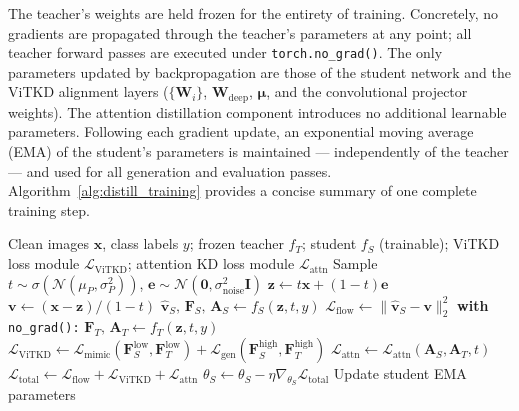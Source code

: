 The teacher's weights are held frozen for the entirety of training. Concretely, no gradients are propagated through the teacher's parameters at any point; all teacher forward passes are executed under \texttt{torch.no\_grad()}. The only parameters updated by backpropagation are those of the student network and the ViTKD alignment layers ($\{\mathbf{W}_i\}$, $\mathbf{W}_{\text{deep}}$, $\boldsymbol{\mu}$, and the convolutional projector weights). The attention distillation component introduces no additional learnable parameters. Following each gradient update, an exponential moving average (EMA) of the student's parameters is maintained — independently of the teacher — and used for all generation and evaluation passes. Algorithm~\ref{alg:distill_training} provides a concise summary of one complete training step.

\begin{algorithm}[ht]
\caption{One Training Step of the Distillation Framework}
\label{alg:distill_training}
\begin{algorithmic}[1]
    \Require Clean images $\mathbf{x}$, class labels $y$; frozen teacher $f_T$; student $f_S$ (trainable); ViTKD loss module $\mathcal{L}_{\text{ViTKD}}$; attention KD loss module $\mathcal{L}_{\text{attn}}$
    \State Sample $t \sim \sigma({\mathcal{N}(\mu_P, \sigma_P^2)})$, $\mathbf{e} \sim \mathcal{N}(\mathbf{0}, \sigma_{\text{noise}}^2\mathbf{I})$
    \State $\mathbf{z} \leftarrow t\mathbf{x} + (1-t)\mathbf{e}$ 
    \State $\mathbf{v} \leftarrow (\mathbf{x} - \mathbf{z}) / (1-t)$ 
    \State $\hat{\mathbf{v}}_S,\, \mathbf{F}_S,\, \mathbf{A}_S \leftarrow f_S(\mathbf{z}, t, y)$ 
    \State $\mathcal{L}_{\text{flow}} \leftarrow \|\hat{\mathbf{v}}_S - \mathbf{v}\|_2^2$
    \State \textbf{with} \texttt{no\_grad():}
    \State \quad $\mathbf{F}_T,\, \mathbf{A}_T \leftarrow f_T(\mathbf{z}, t, y)$ 
    \State $\mathcal{L}_{\text{ViTKD}} \leftarrow \mathcal{L}_{\text{mimic}}(\mathbf{F}_S^{\text{low}}, \mathbf{F}_T^{\text{low}}) + \mathcal{L}_{\text{gen}}(\mathbf{F}_S^{\text{high}}, \mathbf{F}_T^{\text{high}})$
    \State $\mathcal{L}_{\text{attn}} \leftarrow \mathcal{L}_{\text{attn}}(\mathbf{A}_S, \mathbf{A}_T, t)$ 
    \State $\mathcal{L}_{\text{total}} \leftarrow \mathcal{L}_{\text{flow}} + \mathcal{L}_{\text{ViTKD}} + \mathcal{L}_{\text{attn}}$
    \State $\theta_S \leftarrow \theta_S - \eta \nabla_{\theta_S} \mathcal{L}_{\text{total}}$ 
    \State Update student EMA parameters 
\end{algorithmic}
\end{algorithm}

